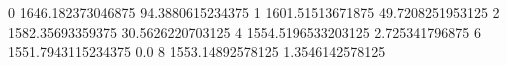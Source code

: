 0 1646.182373046875 94.3880615234375
1 1601.51513671875 49.7208251953125
2 1582.35693359375 30.5626220703125
4 1554.5196533203125 2.725341796875
6 1551.7943115234375 0.0
8 1553.14892578125 1.3546142578125
